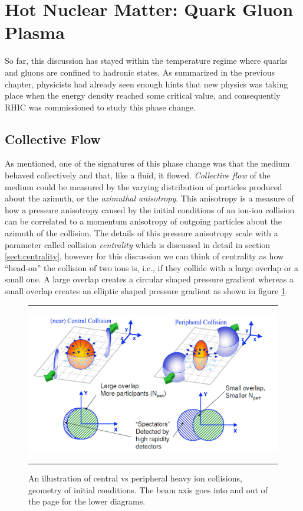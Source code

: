 \section{Hot Nuclear Matter: Quark Gluon Plasma }
So far, this discussion has stayed within the temperature regime where quarks and gluons are confined to hadronic states. As summarized in the previous chapter, physicists had already seen enough hints that new physics was taking place when the energy density reached some critical value, and consequently RHIC was commissioned to study this phase change.

\subsection{Collective Flow}
As mentioned, one of the signatures of this phase change was that the medium behaved collectively and that, like a fluid, it flowed. \textit{Collective flow} of the medium could be measured by the varying distribution of particles produced about the azimuth, or the \textit{azimuthal anisotropy}. This anisotropy is a measure of how a pressure anisotropy caused by the initial conditions of an ion-ion collision can be correlated to a momentum anisotropy of outgoing particles about the azimuth of the collision. The details of this pressure anisotropy scale with a parameter called collision \textit{centrality} which is discussed in detail in section \ref{sect:centrality}, however for this discussion we can think of centrality as how ``head-on'' the collision of two ions is, i.e., if they collide with a large overlap or a small one. A large overlap creates a circular shaped pressure gradient whereas a small overlap creates an elliptic shaped pressure gradient as shown in figure \ref{fig:centvsperiph1}.

\begin{figure}[htbp]
\centering
\rule{35em}{0.5pt}
    \includegraphics[width=1\textwidth]{Figures/centralvsperipheral.jpg}    

	\caption[Central vs Peripheral collisions, geometry of initial conditions]{An illustration of central vs peripheral heavy ion collisions, geometry of initial conditions. The beam axis goes into and out of the page for the lower diagrams.}
\label{fig:centvsperiph1}
\rule{35em}{0.5pt}
\end{figure}

